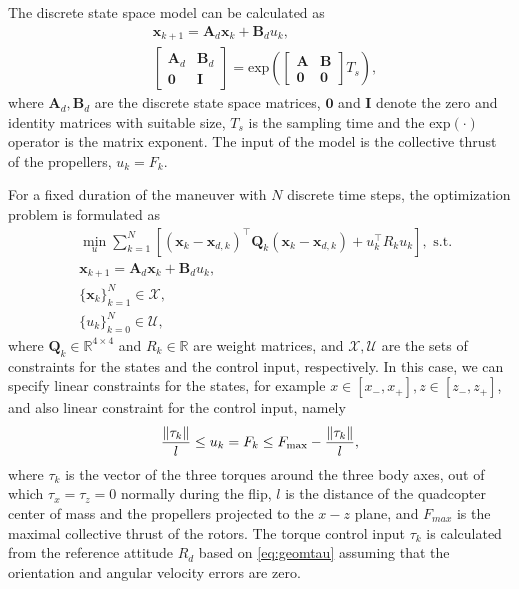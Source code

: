 The discrete state space model can be calculated as \cite{linearsys}
\begin{align}
    & \mathbf x_{k+1} = \mathbf A_d \mathbf x_k + \mathbf B_d u_k,\\
    & \begin{bmatrix} {\mathbf A_{d}} & {\mathbf B_{d}} \\ {\mathbf 0} & {\mathbf I} \end{bmatrix}= \mathrm{exp}\left({{\begin{bmatrix} \mathbf{A} & {\mathbf B} \\ \mathbf{0} & \mathbf{0} \end{bmatrix}}T_s}\right),
\end{align}
where $\mathbf A_d, \mathbf B_d$ are the discrete state space matrices, $\mathbf 0$ and $\mathbf I$ denote the zero and identity matrices with suitable size, $T_s$ is the sampling time and the exp$(\cdot)$ operator is the matrix exponent. The input of the model is the collective thrust of the propellers, $u_k=F_k$.

For a fixed duration of the maneuver with $N$ discrete time steps, the optimization problem is formulated as
\begin{subequations}\label{eq:quadprog}
    \begin{align}
        &\min_u \sum_{k=1}^N \left[ \left(\mathbf x_k-\mathbf x_{d,k}\right)^\top \mathbf Q_k  \left(\mathbf x_k-\mathbf x_{d,k}\right) + u_k^\top R_k u_k\right], \text{ s.t.}\\
        &\mathbf x_{k+1} = \mathbf A_d \mathbf x_k +\mathbf B_d u_k,\\
        &\{ \mathbf x_{k}\}_{k=1}^N \in \mathcal{X},\\
        &\{u_{k}\}_{k=0}^N \in \mathcal{U},
    \end{align}
\end{subequations}
where $\mathbf Q_k\in \mathbb{R}^{4\times 4}$ and $R_k \in\mathbb{R}$ are weight matrices, and $\mathcal{X}, \mathcal{U}$ are the sets of constraints for the states and the control input, respectively. In this case, we can specify linear constraints for the states, for example $x\in[x_-,x_+], z\in[z_-, z_+]$, and also linear constraint for the control input, namely
    \begin{align}
        \frac{\norm{\tau_k}}{l} \leq u_k = F_k \leq F_\mathrm{max}-\frac{\norm{\tau_k}}{l},
    \end{align}
where $\tau_k$ is the vector of the three torques around the three body axes, out of which $\tau_x=\tau_z=0$ normally during the flip, $l$ is the distance of the quadcopter center of mass and the propellers projected to the $x-z$ plane, and $F_{max}$ is the maximal collective thrust of the rotors. The torque control input $\tau_k$ is calculated from the reference attitude $R_d$ based on \eqref{eq:geomtau} assuming that the orientation and angular velocity errors are zero.


